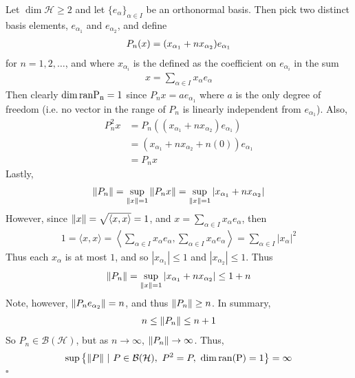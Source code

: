 \documentclass[12pt]{article}
\theoremstyle{plain}
\begin{document}
Let $\dim\mathcal{H} \geq 2$ and let $\{e_\alpha\}_{\alpha \in I}$ be an orthonormal basis.  Then pick two distinct basis elements, $e_{\alpha_1}$ and $e_{\alpha_2}$, and define
\begin{align*}
    P_n(x) = \qty(x_{\alpha_1} + nx_{\alpha_2})e_{\alpha_1}
\end{align*}
for $n = 1, 2, \dots$, and where $x_{\alpha_i}$ is the defined as the coefficient on $e_{\alpha_i}$ in the sum
\begin{align*}
    x = \sum_{\alpha \in I}x_\alpha e_\alpha
\end{align*}
Then clearly $\dim\rm{ran}P_n = 1$ since $P_n x = ae_{\alpha_1}$ where $a$ is the only degree of freedom (i.e. no vector in the range of $P_n$ is linearly independent from $e_{\alpha_1}$).  Also,
\begin{align*}
    P_n^2 x &= P_n((x_{\alpha_1} + nx_{\alpha_2})e_{\alpha_1})\\
    &= (x_{\alpha_1} + nx_{\alpha_2} + n(0))e_{\alpha_1} \\
    &= P_n x
\end{align*}
Lastly,
\begin{align*}
    \norm{P_n} = \sup_{\norm{x} = 1}\norm{P_nx} = \sup_{\norm{x} = 1}\left|x_{\alpha_1} + nx_{\alpha_2}\right|
\end{align*}
However, since $\norm{x} = \sqrt{\langle x, x\rangle} = 1$, and $x = \sum_{\alpha \in I} x_\alpha e_\alpha$, then 
\begin{align*}
    1 = \langle x, x \rangle = \left\langle \sum_{\alpha \in I} x_\alpha e_\alpha, \sum_{\alpha \in I} x_\alpha e_\alpha \right\rangle = \sum_{\alpha \in I} |x_\alpha|^2
\end{align*}
Thus each $x_\alpha$ is at most $1$, and so $|x_{\alpha_1}| \leq 1$ and $|x_{\alpha_2}| \leq 1$.  Thus
\begin{align*}
    \norm{P_n} = \sup_{\norm{x} = 1}|x_{\alpha_1} + nx_{\alpha_2}| \leq 1 + n
\end{align*}
Note, however, $\norm{P_n e_{\alpha_2}} = n$, and thus $\norm{P_n} \geq n$.  In summary,
\begin{align*}
    n \leq \norm{P_n} \leq n + 1
\end{align*}
So $P_n \in \mathcal{B}(\mathcal{H})$, but as $n \rightarrow \infty$, $\norm{P_n} \rightarrow \infty$.  Thus,
\begin{align*}
    \sup\left\{\norm{P}\ |\ P\in\mathcal{B}(\mathcal{H}),\ P^2 = P,\ \dim\rm{ran}(P) = 1\right\} = \infty
\end{align*}
\hfill $\square$
\end{document}
